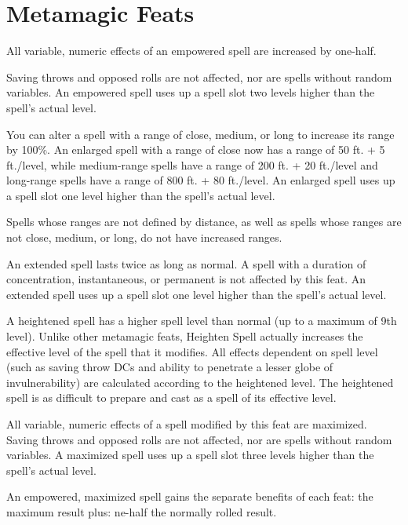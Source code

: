\section{Metamagic Feats}

{All variable, numeric effects of an empowered spell are increased by one-half.

Saving throws and opposed rolls are not affected, nor are spells without random variables. An empowered spell uses up a spell slot two levels higher than the spell's actual level.}

{You can alter a spell with a range of close, medium, or long to increase its range by 100\%. An enlarged spell with a range of close now has a range of 50 ft. + 5 ft./level, while medium-range spells have a range of 200 ft. + 20 ft./level and long-range spells have a range of 800 ft. + 80 ft./level. An enlarged spell uses up a spell slot one level higher than the spell's actual level.

Spells whose ranges are not defined by distance, as well as spells whose ranges are not close, medium, or long, do not have increased ranges.}

{An extended spell lasts twice as long as normal. A spell with a duration of concentration, instantaneous, or permanent is not affected by this feat. An extended spell uses up a spell slot one level higher than the spell's actual level.}

{A heightened spell has a higher spell level than normal (up to a maximum of 9th level). Unlike other metamagic feats, Heighten Spell actually increases the effective level of the spell that it modifies. All effects dependent on spell level (such as saving throw DCs and ability to penetrate a lesser globe of invulnerability) are calculated according to the heightened level. The heightened spell is as difficult to prepare and cast as a spell of its effective level.}

{All variable, numeric effects of a spell modified by this feat are maximized. Saving throws and opposed rolls are not affected, nor are spells without random variables. A maximized spell uses up a spell slot three levels higher than the spell's actual level.

An empowered, maximized spell gains the separate benefits of each feat: the maximum result plus:  ne-half the normally rolled result.}

